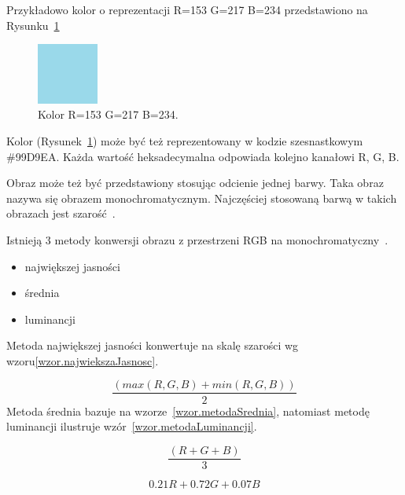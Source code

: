 \documentclass[a4paper,twoside,12pt]{book}
\begin{document}
    Przykładowo kolor o reprezentacji R=153 G=217 B=234 przedstawiono na Rysunku~\ref{fig.mieszanieKolorowBlekitny}

    \begin{figure}
        \centering
        \includegraphics[width=2cm]{Obrazy/blekitny.jpg}
        \caption{Kolor R=153 G=217 B=234.}
        \label{fig.mieszanieKolorowBlekitny}
    \end{figure}

    Kolor (Rysunek~\ref{fig.mieszanieKolorowBlekitny}) może być też reprezentowany w kodzie szesnastkowym \#99D9EA.
    Każda
    wartość heksadecymalna odpowiada kolejno kanałowi R, G, B.

    Obraz może też być przedstawiony stosując odcienie jednej barwy.
    Taka obraz nazywa się obrazem monochromatycznym.
    Najczęściej stosowaną barwą w takich obrazach jest szarość~\cite{przestrzenieKolorow}.

    Istnieją 3 metody konwersji obrazu z przestrzeni RGB na monochromatyczny~\cite{colorMixing}.
    \begin{itemize}
        \item największej jasności
        \item średnia
        \item luminancji
    \end{itemize}
    Metoda największej jasności konwertuje na skalę szarości wg wzoru\ref{wzor.najwiekszaJasnosc}.

    \large
    \begin{equation}
        \frac{(max(R, G, B) + min(R, G, B))}{2}
        \label{wzor.najwiekszaJasnosc}
    \end{equation}
    \normalsize
    Metoda średnia bazuje na wzorze~\ref{wzor.metodaSrednia}, natomiast metodę luminancji ilustruje wzór~\ref{wzor.metodaLuminancji}.

    \large
    \begin{equation}
        \frac{(R + G + B)}{3}
        \label{wzor.metodaSrednia}
    \end{equation}
    \normalsize

    \large
    \begin{equation}
        0.21 R + 0.72 G + 0.07 B
        \label{wzor.metodaLuminancji}
    \end{equation}
    \normalsize
\end{document}
